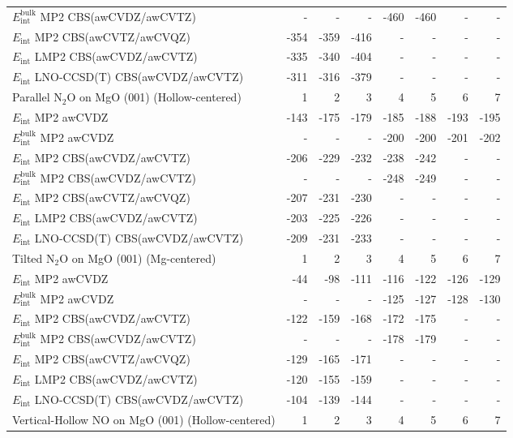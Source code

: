 \begin{longtable}{lrrrrrrr}
$E_\textrm{int}^\textrm{bulk}$ MP2 CBS(awCVDZ/awCVTZ) & - & - & - & -460 & -460 & - & - \\
$E_\textrm{int}$ MP2 CBS(awCVTZ/awCVQZ) & -354 & -359 & -416 & - & - & - & - \\
$E_\textrm{int}$ LMP2 CBS(awCVDZ/awCVTZ) & -335 & -340 & -404 & - & - & - & - \\
$E_\textrm{int}$ LNO-CCSD(T) CBS(awCVDZ/awCVTZ) & -311 & -316 & -379 & - & - & - & - \\
\toprule
Parallel N$_2$O on MgO (001) (Hollow-centered) & 1 & 2 & 3 & 4 & 5 & 6 & 7 \\ 
\midrule
$E_\textrm{int}$ MP2 awCVDZ & -143 & -175 & -179 & -185 & -188 & -193 & -195 \\
$E_\textrm{int}^\textrm{bulk}$ MP2 awCVDZ & - & - & - & -200 & -200 & -201 & -202 \\
$E_\textrm{int}$ MP2 CBS(awCVDZ/awCVTZ) & -206 & -229 & -232 & -238 & -242 & - & - \\
$E_\textrm{int}^\textrm{bulk}$ MP2 CBS(awCVDZ/awCVTZ) & - & - & - & -248 & -249 & - & - \\
$E_\textrm{int}$ MP2 CBS(awCVTZ/awCVQZ) & -207 & -231 & -230 & - & - & - & - \\
$E_\textrm{int}$ LMP2 CBS(awCVDZ/awCVTZ) & -203 & -225 & -226 & - & - & - & - \\
$E_\textrm{int}$ LNO-CCSD(T) CBS(awCVDZ/awCVTZ) & -209 & -231 & -233 & - & - & - & - \\
\toprule
Tilted N$_2$O on MgO (001) (Mg-centered) & 1 & 2 & 3 & 4 & 5 & 6 & 7 \\ 
\midrule
$E_\textrm{int}$ MP2 awCVDZ & -44 & -98 & -111 & -116 & -122 & -126 & -129 \\
$E_\textrm{int}^\textrm{bulk}$ MP2 awCVDZ & - & - & - & -125 & -127 & -128 & -130 \\
$E_\textrm{int}$ MP2 CBS(awCVDZ/awCVTZ) & -122 & -159 & -168 & -172 & -175 & - & - \\
$E_\textrm{int}^\textrm{bulk}$ MP2 CBS(awCVDZ/awCVTZ) & - & - & - & -178 & -179 & - & - \\
$E_\textrm{int}$ MP2 CBS(awCVTZ/awCVQZ) & -129 & -165 & -171 & - & - & - & - \\
$E_\textrm{int}$ LMP2 CBS(awCVDZ/awCVTZ) & -120 & -155 & -159 & - & - & - & - \\
$E_\textrm{int}$ LNO-CCSD(T) CBS(awCVDZ/awCVTZ) & -104 & -139 & -144 & - & - & - & - \\
\toprule
Vertical-Hollow NO on MgO (001) (Hollow-centered) & 1 & 2 & 3 & 4 & 5 & 6 & 7 \\ 

\end{longtable}

